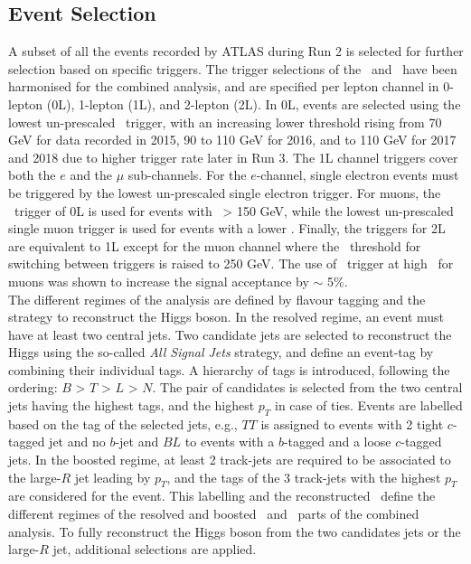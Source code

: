 \subsection{Event Selection}\label{sec-regimeCat}
A subset of all the events recorded by ATLAS during Run 2 is selected for further selection based on specific triggers. The trigger selections of the \vhb\ and \vhc\ have been harmonised for the combined analysis, and are specified per lepton channel in 0-lepton (0L), 1-lepton (1L), and 2-lepton (2L). In 0L, events are selected using the lowest un-prescaled \etm\ trigger, with an increasing lower threshold rising from 70 GeV for data recorded in 2015, 90 to 110 GeV for 2016, and to 110 GeV for 2017 and 2018 due to higher trigger rate later in Run 3. The 1L channel triggers cover both the $e$ and the $\mu$ sub-channels. For the $e$-channel, single electron events must be triggered by the lowest un-prescaled single electron trigger. For muons, the \etm\ trigger of 0L is used for events with \ptv\ > 150 GeV, while the lowest un-prescaled single muon trigger is used for events with a lower \ptv. Finally, the triggers for 2L are equivalent to 1L except for the muon channel where the \ptv\ threshold for switching between triggers is raised to 250 GeV. The use of \etm\ trigger at high \ptv\ for muons was shown to increase the signal acceptance by $\sim$ 5\%.\\ %


The different regimes of the analysis are defined by flavour tagging and the strategy to reconstruct the Higgs boson. In the resolved regime, an event must have at least two central jets. Two candidate jets are selected to reconstruct the Higgs using the so-called \textit{All Signal Jets} strategy, and define an event-tag by combining their individual tags. A hierarchy of tags is introduced, following the ordering: $B$ > $T$ > $L$ > $N$. The pair of candidates is selected from the two central jets having the highest tags, and the highest $p_T$ in case of ties. Events are labelled based on the tag of the selected jets, e.g., $TT$ is assigned to events with 2 tight $c$-tagged jet and no $b$-jet and $BL$ to events with a $b$-tagged and a loose $c$-tagged jets. In the boosted regime, at least 2 track-jets are required to be associated to the large-$R$ jet leading by $p_T$, and the tags of the 3 track-jets with the highest $p_T$ are considered for the event. This labelling and the reconstructed \ptv\ define the different regimes of the resolved and boosted \vhb\ and \vhc\ parts of the combined analysis. To fully reconstruct the Higgs boson from the two candidates jets or the large-$R$ jet, additional selections are applied.


